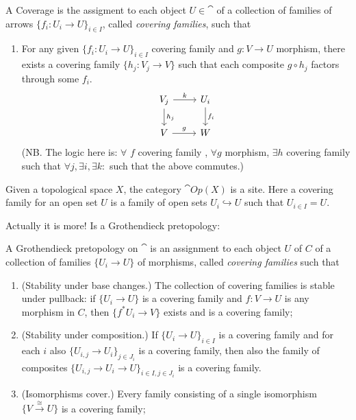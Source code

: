 \documentclass[a4paper,11pt,fleqn]{article}  %
\begin{document}
\begin{definition}[Coverage]
	A Coverage is the assigment to each object $U \in \cat$ of a collection of families of arrows $\{f_i:U_i\to U\}_{i\in I}$, called \emph{covering families}, such that
\begin{enumerate}
	\item For any given $\{f_i:U_i\to U\}_{i\in I}$ covering family and $g:V\to U$ morphism, there exists a covering family $\{h_j:V_j\to V\}$ such that each composite $g \circ h_j$ factors through some $f_i$.
	\begin{displaymath}
		\begin{tikzcd}
		V_j \ar[r,"k"] \ar[d,"h_j"] & U_i \ar[d,"f_i"] \\
		V \ar[r,"g"] & W
		\end{tikzcd}
	\end{displaymath}
	(NB. The logic here is: $\forall$ $f$ covering family , $\forall g$ morphism, $\exists h$ covering family such that $ \forall j, \exists i, \exists k \colon$ such that the above commutes.)
\end{enumerate}
\end{definition}

\begin{example}
	Given a topological space $X$, the category $\cat{Op}(X)$ is a site.
	Here a covering family for an open set $U$ is a family of open sets $U_i \hookrightarrow U$ such that $U_{i\in I} = U$. 
\end{example}
Actually it is more! Is a Grothendieck pretopology:

\begin{definition}
A Grothendieck pretopology on $\cat$ is an assignment to each object  $U$ of $C$ of a collection of families $\{U_i \to U\}$ of morphisms, called \emph{covering families} such that
\begin{enumerate}
	\item (Stability under base changes.)
The collection of covering families is stable under pullback: if $\{U_i \to U\}$ is a covering family and $f : V \to U$ is any morphism in $C$, then $\{f^* U_i \to V\}$ exists and is a covering family;
	\item (Stability under composition.)
If $\{U_i \to U\}_{i \in I}$ is a covering family and for each $i$ also $\{U_{i,j} \to U_i\}_{j \in J_i}$ is a covering family, then also the family of composites $\{U_{i,j} \to U_i \to U\}_{i\in I, j \in J_i}$ is a covering family.
	\item (Isomorphisms cover.)
Every family consisting of a single isomorphism $\{V \stackrel{\cong}{\to}U\}$ is a covering family;
\end{enumerate}
\end{definition}
\end{document}
